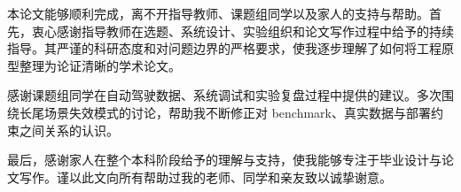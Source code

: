 
\begin{acknowledgements}

本论文能够顺利完成，离不开指导教师、课题组同学以及家人的支持与帮助。首先，衷心感谢指导教师在选题、系统设计、实验组织和论文写作过程中给予的持续指导。其严谨的科研态度和对问题边界的严格要求，使我逐步理解了如何将工程原型整理为论证清晰的学术论文。

感谢课题组同学在自动驾驶数据、系统调试和实验复盘过程中提供的建议。多次围绕长尾场景失效模式的讨论，帮助我不断修正对 benchmark、真实数据与部署约束之间关系的认识。

最后，感谢家人在整个本科阶段给予的理解与支持，使我能够专注于毕业设计与论文写作。谨以此文向所有帮助过我的老师、同学和亲友致以诚挚谢意。

\end{acknowledgements}
